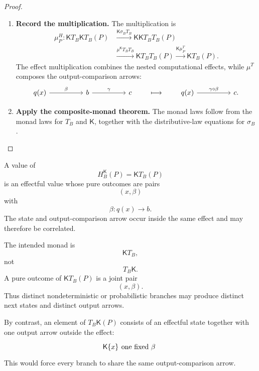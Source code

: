 \begin{proof}
\begin{enumerate}
        \item \textbf{Record the multiplication.}
        The multiplication is
        \[
        \begin{aligned}
            \mu^H_P:
            \mathsf K T_B\mathsf K T_B(P)
                &\xrightarrow{\mathsf K\sigma_B T_B}
            \mathsf K\mathsf K T_BT_B(P)
            \\
                &\xrightarrow{\mu^{\mathsf K}T_BT_B}
            \mathsf K T_BT_B(P)
            \xrightarrow{\mathsf K\mu^T_P}
            \mathsf K T_B(P).
        \end{aligned}
        \]
        The effect multiplication combines the nested computational effects,
        while \(\mu^T\) composes the output-comparison arrows:
        \[
            \begin{tikzcd}[column sep=huge]
                    q(x)
                        \arrow[r, "\beta"]
                &
                    b
                        \arrow[r, "\gamma"]
                &
                    c
            \end{tikzcd}
            \qquad\longmapsto\qquad
            \begin{tikzcd}[column sep=huge]
                    q(x)
                        \arrow[r, "\gamma\circ\beta"]
                &
                    c.
            \end{tikzcd}
        \]

        \item \textbf{Apply the composite-monad theorem.}
        The monad laws follow from the monad laws for \(T_B\) and
        \(\mathsf K\), together with the distributive-law equations for
        \(\sigma_B\).
    \end{enumerate}
\end{proof}

A value of
\[
    H_B^{\mathsf K}(P)
    =
    \mathsf K T_B(P)
\]
is an effectful value whose pure outcomes are pairs
\[
    (x,\beta)
\]
with
\[
    \beta:q(x)\to b.
\]
The state and output-comparison arrow occur inside the same effect and may
therefore be correlated.

\begin{remark}
\label{rem:effectful-output-composite-order}
    The intended monad is
    \[
        \mathsf K T_B,
    \]
    not
    \[
        T_B\mathsf K.
    \]
    A pure outcome of \(\mathsf K T_B(P)\) is a joint pair
    \[
        (x,\beta).
    \]
    Thus distinct nondeterministic or probabilistic branches may produce
    distinct next states and distinct output arrows.

    By contrast, an element of \(T_B\mathsf K(P)\) consists of an effectful
    state together with one output arrow outside the effect:
    \[
        \begin{tikzcd}[column sep=huge]
                \mathsf K\{x\}
                    \arrow[r, phantom, "\text{one fixed }\beta"]
            &
                {}
        \end{tikzcd}
    \]
    This would force every branch to share the same output-comparison arrow.
\end{remark}

